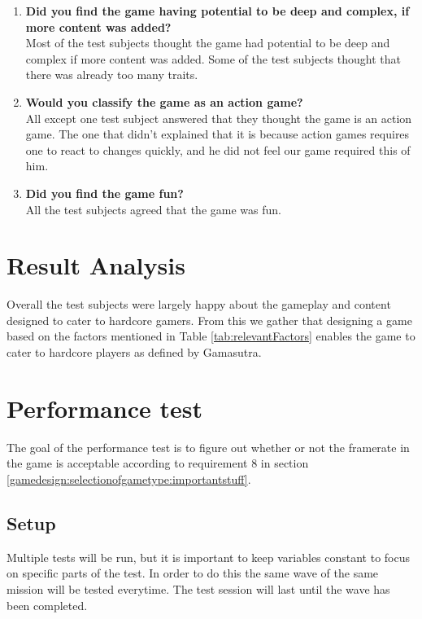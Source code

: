\begin{enumerate}
\item \textbf{Did you find the game having potential to be deep and complex, if more content was added?}\vspace{4pt}\\
Most of the test subjects thought the game had potential to be deep and complex if more content was added.
Some of the test subjects thought that there was already too many traits.

\item \textbf{Would you classify the game as an action game?}\vspace{4pt}\\
All except one test subject answered that they thought the game is an action game.
The one that didn't explained that it is because action games requires one to react to changes quickly, and he did not feel our game required this of him.

\item \textbf{Did you find the game fun?}\vspace{4pt}\\
All the test subjects agreed that the game was fun.
\end{enumerate}

\section{Result Analysis}
Overall the test subjects were largely happy about the gameplay and content designed to cater to hardcore gamers.
From this we gather that designing a game based on the factors mentioned in Table \ref{tab:relevantFactors} enables the game to cater to hardcore players as defined by Gamasutra\cite{casual_vs_hardcore}.

\section{Performance test}
The goal of the performance test is to figure out whether or not the framerate in the game is acceptable according to requirement 8 in section \ref{gamedesign:selectionofgametype:importantstuff}. 

\subsection{Setup}
Multiple tests will be run, but it is important to keep variables constant to focus on specific parts of the test. In order to do this the same wave of the same mission will be tested everytime. The test session will last until the wave has been completed. 

